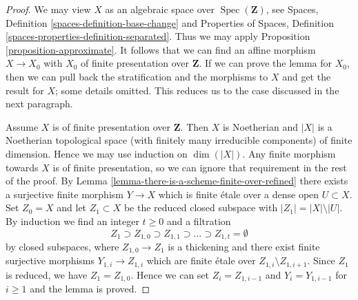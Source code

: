 \documentclass{stacks-project}
\theoremstyle{plain}
\theoremstyle{definition}
\theoremstyle{remark}
\numberwithin{equation}{subsection}
\def\Spec{\mathop{\mathrm{Spec}}}
\begin{document}
\begin{proof}
We may view $X$ as an algebraic space over $\Spec(\mathbf{Z})$, see
Spaces, Definition \ref{spaces-definition-base-change} and
Properties of Spaces, Definition \ref{spaces-properties-definition-separated}.
Thus we may apply Proposition \ref{proposition-approximate}.
It follows that we can find an affine morphism $X \to X_0$
with $X_0$ of finite presentation over $\mathbf{Z}$.
If we can prove the lemma for $X_0$, then we can pull back
the stratification and the morphisms to $X$ and get the result for $X$;
some details omitted. This reduces us to the case discussed in the
next paragraph.

\medskip\noindent
Assume $X$ is of finite presentation over $\mathbf{Z}$.
Then $X$ is Noetherian and $|X|$ is a Noetherian topological
space (with finitely many irreducible components) of finite dimension.
Hence we may use induction on $\dim(|X|)$.
Any finite morphism towards $X$ is of finite presentation, so
we can ignore that requirement in the rest of the proof.
By Lemma \ref{lemma-there-is-a-scheme-finite-over-refined}
there exists a surjective finite morphism $Y \to X$ which is
finite \'etale over a dense open $U \subset X$.
Set $Z_0 = X$ and let $Z_1 \subset X$ be the reduced closed subspace
with $|Z_1| = |X| \setminus |U|$.
By induction we find an integer $t \geq 0$ and a filtration
$$
Z_1 \supset Z_{1, 0} \supset Z_{1, 1} \supset \ldots
\supset Z_{1, t} = \emptyset
$$
by closed subspaces, where $Z_{1, 0} \to Z_1$ is a thickening
and there exist finite surjective morphisms $Y_{1, i} \to Z_{1, i}$
which are finite \'etale over $Z_{1, i} \setminus Z_{1, i + 1}$.
Since $Z_1$ is reduced, we have $Z_1 = Z_{1, 0}$.
Hence we can set $Z_i = Z_{1, i - 1}$ and $Y_i = Y_{1, i - 1}$
for $i \geq 1$ and the lemma is proved.
\end{proof}
\end{document}
